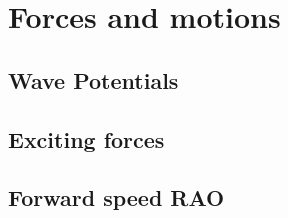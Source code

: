 \chapter{Forces and motions}
\section{Wave Potentials}
\section{Exciting forces}
\section{Forward speed RAO}